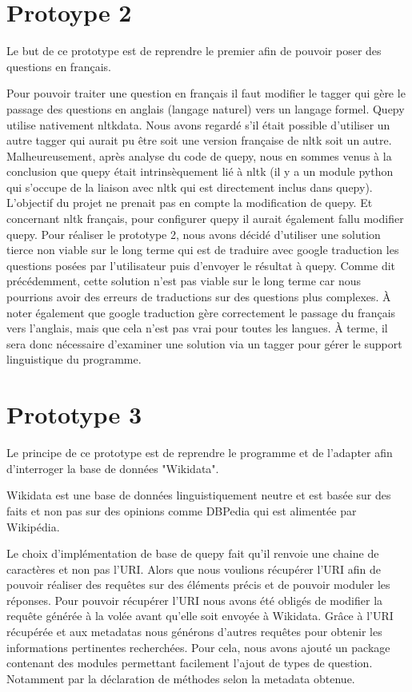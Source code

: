 \documentclass[11pt,a4paper]{article}
\begin{document}
\section*{Protoype 2}\par
Le but de ce prototype est de reprendre le premier afin de pouvoir poser des questions en français.\par
Pour pouvoir traiter une question en français il faut modifier le tagger qui gère le passage des questions en anglais (langage naturel) vers un langage formel. 
Quepy utilise nativement nltkdata. Nous avons regardé s’il était possible d’utiliser un autre tagger qui aurait pu être soit une version française de nltk soit un autre. 
Malheureusement, après analyse du code de quepy, nous en sommes venus à la conclusion que quepy était intrinsèquement lié à nltk (il y a un module python qui s’occupe de la liaison avec nltk qui est directement inclus dans quepy). 
L’objectif du projet ne prenait pas en compte la modification de quepy. Et concernant nltk français, pour configurer quepy il aurait également fallu modifier quepy. 
Pour réaliser le prototype 2, nous avons décidé d’utiliser une solution tierce non viable sur le long terme qui est de traduire avec google traduction les questions posées par l’utilisateur puis d’envoyer le résultat à quepy. 
Comme dit précédemment, cette solution n’est pas viable sur le long terme car nous pourrions avoir des erreurs de traductions sur des questions plus complexes. 
À noter également que google traduction gère correctement le passage du français vers l’anglais, mais que cela n’est pas vrai pour toutes les langues. 
À terme, il sera donc nécessaire d’examiner une solution via un tagger pour gérer le support linguistique du programme. 

\section*{Prototype 3}\par
Le principe de ce prototype est de reprendre le programme et de l’adapter afin d’interroger la base de données "Wikidata".

Wikidata est une base de données linguistiquement neutre et est basée sur des faits et non pas sur des opinions comme DBPedia qui est alimentée par Wikipédia.\par
Le choix d’implémentation de base de quepy fait qu’il renvoie une chaine de caractères et non pas l’URI. Alors que nous voulions récupérer l’URI afin de pouvoir réaliser des requêtes sur des éléments précis et de pouvoir moduler les réponses.
Pour pouvoir récupérer l’URI nous avons été obligés de modifier la requête générée à la volée avant qu’elle soit envoyée à Wikidata. 
Grâce à l’URI récupérée et aux metadatas nous générons d’autres requêtes pour obtenir les informations pertinentes recherchées.
Pour cela, nous avons ajouté un package contenant des modules permettant facilement l’ajout de types de question. Notamment par la déclaration de méthodes selon la metadata obtenue.\par
\end{document}
